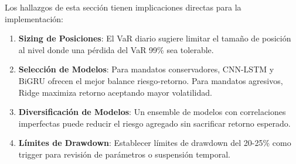 Los hallazgos de esta secci\'on tienen implicaciones directas para la implementaci\'on:

\begin{enumerate}
    \item \textbf{Sizing de Posiciones}: El VaR diario sugiere limitar el tama\~no de posici\'on al nivel donde una p\'erdida del VaR 99\% sea tolerable.

    \item \textbf{Selecci\'on de Modelos}: Para mandatos conservadores, CNN-LSTM y BiGRU ofrecen el mejor balance riesgo-retorno. Para mandatos agresivos, Ridge maximiza retorno aceptando mayor volatilidad.

    \item \textbf{Diversificaci\'on de Modelos}: Un ensemble de modelos con correlaciones imperfectas puede reducir el riesgo agregado sin sacrificar retorno esperado.

    \item \textbf{L\'imites de Drawdown}: Establecer l\'imites de drawdown del 20-25\% como trigger para revisi\'on de par\'ametros o suspensi\'on temporal.
\end{enumerate}

